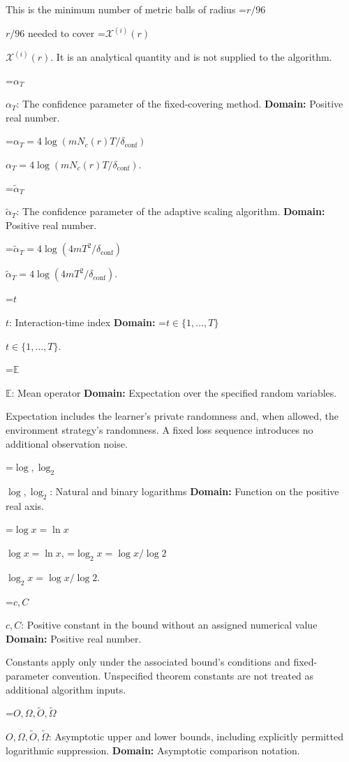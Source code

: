 \documentclass[10pt,a4paper]{article}
\newcommand{\AtlasMath}[1]{\par\begingroup\centering\setbox0=\hbox{$\displaystyle #1$}\ifdim\wd0>1.4\linewidth\typeout{ATLAS WIDE FORMULA: \the\wd0}\fi\ifdim\wd0>\linewidth\resizebox{\linewidth}{!}{\box0}\else\box0\fi\par\endgroup}
\newcommand{\AtlasInlineMath}[1]{\begingroup\setbox0=\hbox{$#1$}\ifdim\wd0>.4\linewidth\endgroup\AtlasMath{#1}\else\endgroup$#1$\fi}
\begin{document}
This is the minimum number of metric balls of radius \AtlasInlineMath{r/96} needed to cover \AtlasInlineMath{\mathcal X^{(i)}(r)}. It is an analytical quantity and is not supplied to the algorithm.



\AtlasInlineMath{\alpha_T}: The confidence parameter of the fixed-covering method. \textbf{Domain:} Positive real number.



\AtlasInlineMath{\alpha_T=4\log(mN_c(r)T/\delta_{\mathrm{conf}})}.



\AtlasInlineMath{\widetilde\alpha_T}: The confidence parameter of the adaptive scaling algorithm. \textbf{Domain:} Positive real number.



\AtlasInlineMath{\widetilde\alpha_T=4\log(4mT^2/\delta_{\mathrm{conf}})}.



\AtlasInlineMath{t}: Interaction-time index \textbf{Domain:} \AtlasInlineMath{t\in\{1,\ldots,T\}}.



\AtlasInlineMath{\mathbb E}: Mean operator \textbf{Domain:} Expectation over the specified random variables.



Expectation includes the learner's private randomness and, when allowed, the environment strategy's randomness. A fixed loss sequence introduces no additional observation noise.



\AtlasInlineMath{\log,\log_2}: Natural and binary logarithms \textbf{Domain:} Function on the positive real axis.



\AtlasInlineMath{\log x=\ln x}, \AtlasInlineMath{\log_2x=\log x/\log2}.



\AtlasInlineMath{c,C}: Positive constant in the bound without an assigned numerical value \textbf{Domain:} Positive real number.



Constants apply only under the associated bound’s conditions and fixed-parameter convention. Unspecified theorem constants are not treated as additional algorithm inputs.



\AtlasInlineMath{O,\Omega,\widetilde O,\widetilde\Omega}: Asymptotic upper and lower bounds, including explicitly permitted logarithmic suppression. \textbf{Domain:} Asymptotic comparison notation.
\end{document}
